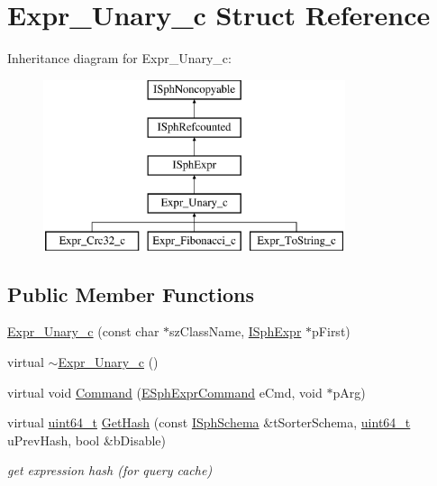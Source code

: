 \hypertarget{structExpr__Unary__c}{\section{Expr\-\_\-\-Unary\-\_\-c Struct Reference}
\label{structExpr__Unary__c}
}
Inheritance diagram for Expr\-\_\-\-Unary\-\_\-c\-:\begin{figure}[H]
\begin{center}
\leavevmode
\includegraphics[height=5.000000cm]{structExpr__Unary__c}
\end{center}
\end{figure}
\subsection*{Public Member Functions}
\begin{DoxyCompactItemize}
\item 
\hyperlink{structExpr__Unary__c_aa663880a098ef4ca2ebdac20a6d6ea38}{Expr\-\_\-\-Unary\-\_\-c} (const char $\ast$sz\-Class\-Name, \hyperlink{structISphExpr}{I\-Sph\-Expr} $\ast$p\-First)
\item 
virtual \hyperlink{structExpr__Unary__c_aeec781a74875d7e652284e275a69b11d}{$\sim$\-Expr\-\_\-\-Unary\-\_\-c} ()
\item 
virtual void \hyperlink{structExpr__Unary__c_a7a1343dd690f55030cb35c802a3a98ba}{Command} (\hyperlink{sphinxexpr_8h_a30be184fb07bd80c271360fc6094c818}{E\-Sph\-Expr\-Command} e\-Cmd, void $\ast$p\-Arg)
\item 
virtual \hyperlink{sphinxstd_8h_aaa5d1cd013383c889537491c3cfd9aad}{uint64\-\_\-t} \hyperlink{structExpr__Unary__c_a7dd8c4eb0c4be962230b0abfdfe82647}{Get\-Hash} (const \hyperlink{classISphSchema}{I\-Sph\-Schema} \&t\-Sorter\-Schema, \hyperlink{sphinxstd_8h_aaa5d1cd013383c889537491c3cfd9aad}{uint64\-\_\-t} u\-Prev\-Hash, bool \&b\-Disable)
\begin{DoxyCompactList}\small\item\em get expression hash (for query cache) \end{DoxyCompactList}\end{DoxyCompactItemize}
